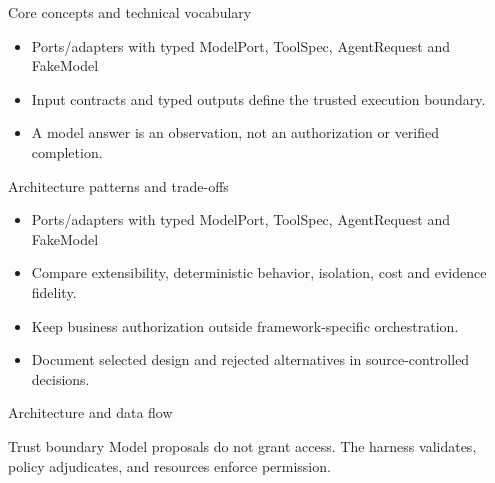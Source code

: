 \documentclass[aspectratio=169,10pt]{beamer}
\begin{document}
\begin{frame}{Core concepts and technical vocabulary}
\small
\begin{itemize}
\item Ports/adapters with typed ModelPort, ToolSpec, AgentRequest and FakeModel
\item Input contracts and typed outputs define the trusted execution boundary.
\item A model answer is an observation, not an authorization or verified completion.
\end{itemize}

\end{frame}

\begin{frame}{Architecture patterns and trade-offs}
\small
\begin{itemize}
\item Ports/adapters with typed ModelPort, ToolSpec, AgentRequest and FakeModel
\item Compare extensibility, deterministic behavior, isolation, cost and evidence fidelity.
\item Keep business authorization outside framework-specific orchestration.
\item Document selected design and rejected alternatives in source-controlled decisions.
\end{itemize}

\end{frame}

\begin{frame}{Architecture and data flow}
\small
\centering
{}
\vspace{0.6cm}
\begin{block}{Trust boundary}
Model proposals do not grant access. The harness validates, policy adjudicates, and resources enforce permission.
\end{block}
\end{frame}
\end{document}
